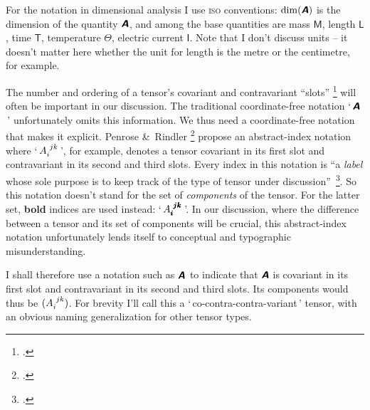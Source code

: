 \documentclass[\ifafour a4paper,12pt,\else a5paper,10pt,\fi%
onecolumn,oneside,article,%
british%
]{memoir}
\makeatletter
\newcommand*{\defquote}[1]{`\,#1\,'}
\theoremstyle{remark}
\theoremstyle{innote}
\newcommand*{\mathte}[1]{\textbf{\textit{\textsf{#1}}}}
\newcommand*{\citep}{\footcites}
\newcommand*{\amp}{\&}
\renewcommand*{\|}[1][]{\nonscript\,#1\vert\nonscript\;\mathopen{}}
\newcommand*{\sect}{\S}%
\newcommand*{\q}{}%
\DeclareRobustCommand*{\q}{%
  \mathbin{\mathpalette\bigcdot@{}}%
}
\newcommand*{\bigcdot@scalefactor}{0.7}
\newcommand*{\bigcdot@widthfactor}{1.5}
\newcommand*{\bigcdot@}[2]{%
  \sbox0{$#1\vcenter{}$}%
  \sbox2{$#1\cdot\m@th$}%
  \hbox to \bigcdot@widthfactor\wd2{%
    \hfil
    \raise\ht0\hbox{%
      \scalebox{\bigcdot@scalefactor}{%
        \lower\ht0\hbox{$#1\bullet\m@th$}%
      }%
    }%
    \hfil
  }%
}
\newcommand*{\Le}{\textsf{L}}
\newcommand*{\Ti}{\textsf{T}}
\newcommand*{\Ma}{\textsf{M}}
\newcommand*{\Te}{\Theta}
\newcommand*{\Cu}{\textsf{I}}
\newcommand*{\yA}{\mathte{A}}
\renewcommand*{\i}{\indices}
\makeatother
\begin{document}
\bigskip

For the notation in dimensional analysis I use \textsc{iso} conventions:
$\dim(\yA)$ is the dimension of the quantity $\yA$, and among the base
quantities are mass $\Ma$, length $\Le$, time $\Ti$, temperature $\Te$,
electric current $\Cu$. Note that I don't discuss units -- it
doesn't matter here whether the unit for length is the metre or the
centimetre, for example.

The number and ordering of a tensor's covariant and contravariant
\enquote{slots} \citep[\sect~3.2]{misneretal1970_r1973} will often be
important in our discussion. The traditional coordinate-free notation
\defquote{$\yA$} unfortunately omits this information. We thus need a
coordinate-free notation that makes it explicit. Penrose \amp\ Rindler
\citep[\sect~2.2]{penroseetal1984_r2003} propose an abstract-index notation
where \defquote{$A\i{_{i}^{jk}}$}, for example, denotes a tensor covariant
in its first slot and contravariant in its second and third slots. Every
index in this notation is \enquote{a \emph{label} whose sole purpose is to
  keep track of the type of tensor under
  discussion}~\citep[p.~75]{penroseetal1984_r2003}. So this notation
doesn't stand for the set of \emph{components} of the tensor. For the
latter set, \textbf{bold} indices are used instead:
\defquote{$A\i{_{\pmb{i}}^{\pmb{j}\pmb{k}}}$}. In our discussion, where the
difference between a tensor and its set of components will be crucial, this
abstract-index notation unfortunately lends itself to conceptual and
typographic misunderstanding.

I shall therefore use a notation such as $\yA\i{_{\q}^{\q\q}}$ to indicate
that $\yA$ is covariant in its first slot and contravariant in its second
and third slots. Its components would thus be $(A\i{_{i}^{jk}})$. For
brevity I'll call this a \defquote{co-contra-contra-variant} tensor, with
an obvious naming generalization for other tensor
types. %
\end{document}
